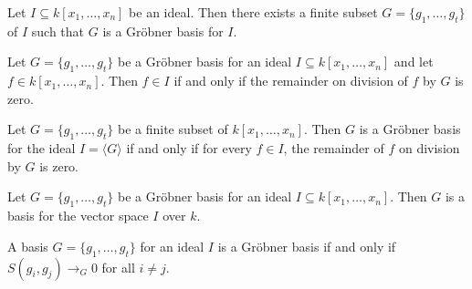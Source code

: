         \begin{lemma}\label{exists_groebner_basis}
          \leanok
          Let \( I \subseteq k[x_1, \ldots, x_n] \) be an ideal. Then there exists a finite subset \( G = \{g_1, \ldots, g_t\} \) of \( I \) such that \( G \) is a Gröbner basis for \( I \).

        \end{lemma}

        \begin{lemma}\label{groebner_basis_isRemainder_zero_iff_mem_span}
          
          Let \( G = \{g_1, \dots, g_t\} \) be a Gröbner basis for an ideal \( I \subseteq k[x_1, \dots, x_n] \) and let \( f \in k[x_1, \dots, x_n] \). Then \( f \in I \) if and only if the remainder on division of \( f \) by \( G \) is zero.

        \end{lemma}

        \begin{lemma}\label{is_groebner_basis_iff}
          
          Let \( G = \{g_1, \ldots, g_t\} \) be a finite subset of \( k[x_1, \ldots, x_n] \). Then \( G \) is a Gröbner basis for the ideal \( I = \langle G \rangle \) if and only if  for every \( f \in I \), the remainder of \( f \) on division by \( G \) is zero.

        \end{lemma}

        \begin{lemma}\label{groebner_basis_is_basis}
          
          Let \( G = \{g_1, \ldots, g_t\} \) be a Gröbner basis for an ideal \( I \subseteq k[x_1, \ldots, x_n] \). Then \( G \) is a basis for the vector space \( I \) over \( k \).

        \end{lemma}

        \begin{lemma}\label{buchberger_criterion}
          
          A basis \( G = \{ g_1, \ldots, g_t \} \) for an ideal \( I \) is a Gröbner basis if and only if \( S(g_i, g_j) \to_G 0 \) for all \( i \neq j \).

        \end{lemma}

